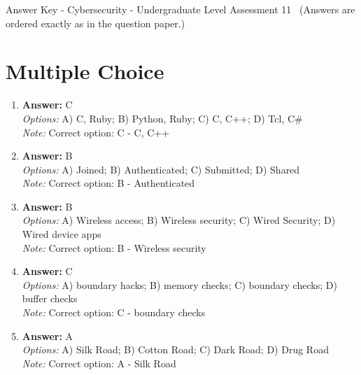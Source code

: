 \documentclass[12pt]{article}
\begin{document}
\begin{center}
Answer Key - Cybersecurity - Undergraduate Level Assessment 11 \
\small (Answers are ordered exactly as in the question paper.)
\end{center}

\section*{Multiple Choice}
\begin{enumerate}[label=\arabic*.]
\item \textbf{Answer:} C
\\ \textit{Options:} A) C, Ruby; B) Python, Ruby; C) C, C++; D) Tcl, C\#
\\ \textit{Note:} Correct option: C - C, C++
\item \textbf{Answer:} B
\\ \textit{Options:} A) Joined; B) Authenticated; C) Submitted; D) Shared
\\ \textit{Note:} Correct option: B - Authenticated
\item \textbf{Answer:} B
\\ \textit{Options:} A) Wireless access; B) Wireless security; C) Wired Security; D) Wired device apps
\\ \textit{Note:} Correct option: B - Wireless security
\item \textbf{Answer:} C
\\ \textit{Options:} A) boundary hacks; B) memory checks; C) boundary checks; D) buffer checks
\\ \textit{Note:} Correct option: C - boundary checks
\item \textbf{Answer:} A
\\ \textit{Options:} A) Silk Road; B) Cotton Road; C) Dark Road; D) Drug Road
\\ \textit{Note:} Correct option: A - Silk Road
\end{enumerate}
\end{document}

